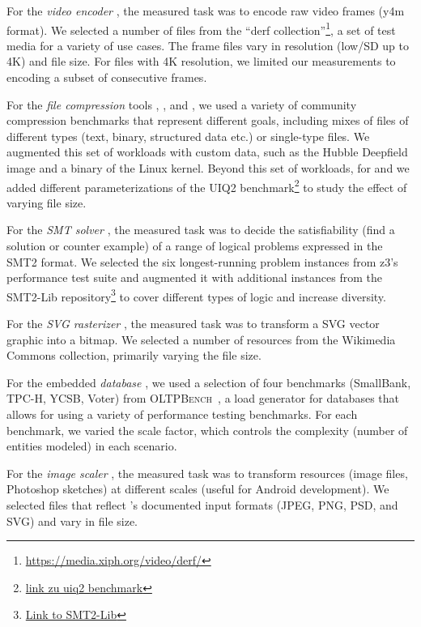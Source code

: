{For the \textit{video encoder} \xzwo, the measured task was to encode raw video frames (y4m format). We selected a number of files from the “derf collection”\footnote{\url{https://media.xiph.org/video/derf/}}, a set of test media for a variety of use cases. The frame files vary in resolution (low/SD up to 4K) and file size. For files with 4K resolution, we limited our measurements to encoding a subset of consecutive frames.

For the \textit{file compression} tools \kanzi, \xz, and \lrzip, we used a variety of community compression benchmarks that represent different goals, including mixes of files of different types (text, binary, structured data etc.) or single-type files. We augmented this set of workloads with custom data, such as the Hubble Deepfield image and a binary of the Linux kernel. Beyond this set of workloads, for \xz and \lrzip we added different parameterizations of the UIQ2 benchmark\footnote{\url{link zu uiq2 benchmark}} to study the effect of varying file size. 

For the \textit{SMT solver} \zdrei, the measured task was to decide the satisfiability (find a solution or counter example) of a range of logical problems expressed in the SMT2 format. We selected the six longest-running problem instances from z3’s performance test suite and augmented it with additional instances from the SMT2-Lib repository\footnote{\url{Link to SMT2-Lib}} to cover different types of logic and increase diversity.

For the \textit{SVG rasterizer} \batik, the measured task was to transform a SVG vector graphic into a bitmap. We selected a number of resources from the Wikimedia Commons collection, primarily varying the file size.

For the embedded \textit{database} \htwo, we used a selection of four benchmarks (SmallBank, TPC-H, YCSB, Voter) from \textsc{OLTPBench}~\cite{difallah_oltp_2013}, a load generator for databases that allows for using a variety of performance testing benchmarks. For each benchmark, we varied the scale factor, which controls the complexity (number of entities modeled) in each scenario.

For the \textit{image scaler} \dconvert, the measured task was to transform resources (image files, Photoshop sketches) at different scales (useful for Android development). We selected files that reflect \dconvert's documented input formats (JPEG, PNG, PSD, and SVG) and vary in file size.
}

